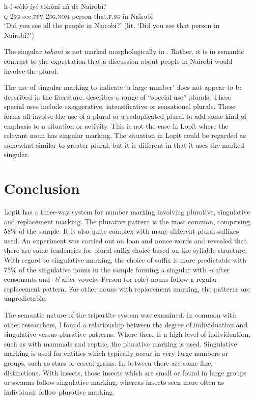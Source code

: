 \documentclass[output=paper]{langsci/langscibook}
\begin{document}
\ea\label{ex:moodie:14}
\gll h-í-wòló íyé tòhòní nà dè Naìróbí? \\
\textsc{q-2sg}-see.\textsc{pfv} 2\textsc{sg.nom} person that.\textsc{f.sg} in Nairobi \\
\glt ‘Did you see all the people in Nairobi?’ (lit. ‘Did you see that person in Nairobi?’)
\z

The singular \textit{tohoni} is not marked morphologically in . Rather, it is in semantic contrast to the expectation that a discussion about people in Nairobi would involve the plural.

The use of singular marking to indicate ‘a large number’ does not appear to be described in the literature. \citet[234]{Corbett2000} describes a range of “special use” plurals. These special uses include exaggerative, intensificative or sensational plurals. These forms all involve the use of a plural or a reduplicated plural to add some kind of emphasis to a situation or activity. This is not the case in Lopit where the relevant noun has singular marking. The situation in Lopit could be regarded as somewhat similar to greater plural, but it is different in that it uses the marked singular. 

\section{Conclusion}

Lopit has a three-way system for number marking involving plurative, singulative and replacement marking. The plurative pattern is the most common, comprising 58\% of the sample. It is also quite complex with many different plural suffixes used. An experiment was carried out on loan and nonce words and revealed that there are some tendencies for plural suffix choice based on the syllable structure. With regard to singulative marking, the choice of suffix is more predictable with 75\% of the singulative nouns in the sample forming a singular with \textit{-i} after consonants and \textit{-ti} after vowels. Person (or role) nouns follow a regular replacement pattern. For other nouns with replacement marking, the patterns are unpredictable.

The semantic nature of the tripartite system was examined. In common with other researchers, I found a relationship between the degree of individuation and singulative versus plurative patterns. Where there is a high level of individuation, such as with mammals and reptile, the plurative marking is used. Singulative marking is used for entities which typically occur in very large numbers or groups, such as stars or cereal grains. In between there are some finer distinctions. With insects, those insects which are small or found in large groups or swarms follow singulative marking, whereas insects seen more often as individuals follow plurative marking.
\end{document}
